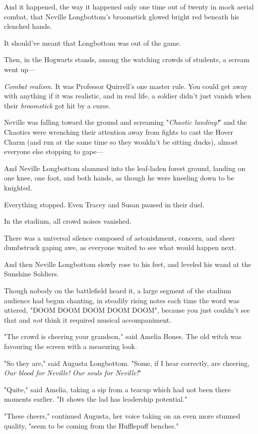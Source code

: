 And it happened, the way it happened only one time out of twenty in mock aerial
combat, that Neville Longbottom's broomstick glowed bright red beneath his
clenched hands.

It should've meant that Longbottom was out of the game.

Then, in the Hogwarts stands, among the watching crowds of students, a scream
went up---

\emph{Combat realism.} It was Professor Quirrell's one master rule. You could
get away with anything if it was realistic, and in real life, a soldier didn't
just vanish when their \emph{broomstick} got hit by a curse.

Neville was falling toward the ground and screaming "\emph{Chaotic landing!}"
and the Chaotics were wrenching their attention away from fights to cast the
Hover Charm (and run at the same time so they wouldn't be sitting ducks),
almost everyone else stopping to gape---

And Neville Longbottom slammed into the leaf-laden forest ground, landing on
one knee, one foot, and both hands, as though he were kneeling down to be
knighted.

Everything stopped. Even Tracey and Susan paused in their duel.

In the stadium, all crowd noises vanished.

There was a universal silence composed of astonishment, concern, and sheer
dumbstruck gaping awe, as everyone waited to see what would happen next.

And then Neville Longbottom slowly rose to his feet, and leveled his wand at
the Sunshine Soldiers.

Though nobody on the battlefield heard it, a large segment of the stadium
audience had begun chanting, in steadily rising notes each time the word was
uttered, "DOOM DOOM DOOM DOOM DOOM", because you just couldn't see that and
\emph{not} think it required musical accompaniment.

"The crowd is cheering your grandson," said Amelia Bones. The old witch was
favouring the screen with a measuring look.

"So they are," said Augusta Longbottom. "Some, if I hear correctly, are
cheering, \emph{Our blood for Neville! Our souls for Neville!}"

"Quite," said Amelia, taking a sip from a teacup which had not been there
moments earlier. "It shows the lad has leadership potential."

"These cheers," continued Augusta, her voice taking on an even more stunned
quality, "seem to be coming from the Hufflepuff benches."

